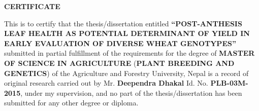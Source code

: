 \clearpage
  {\fontsize{12}{14}
  \centerline{\bfseries CERTIFICATE}
  \thispagestyle{empty}
  \null\vspace*{2cm}

  \begingroup
  This is to certify that the thesis/dissertation entitled \textbf{``POST-ANTHESIS LEAF HEALTH AS POTENTIAL DETERMINANT OF YIELD IN EARLY EVALUATION OF DIVERSE WHEAT GENOTYPES''} submitted in partial fulfillment of the requirements for the degree of \textbf{MASTER OF SCIENCE IN AGRICULTURE} (\textbf{PLANT BREEDING AND GENETICS}) of the Agriculture and Forestry University, Nepal is a record of original research carried out by Mr. \textbf{Deependra Dhakal} Id. No. \textbf{PLB-03M-2015}, under my supervision, and no part of the thesis/dissertation has been submitted for any other degree or diploma.
  \endgroup
  
  \vskip 1in		%
  
  
  \clearpage
}

